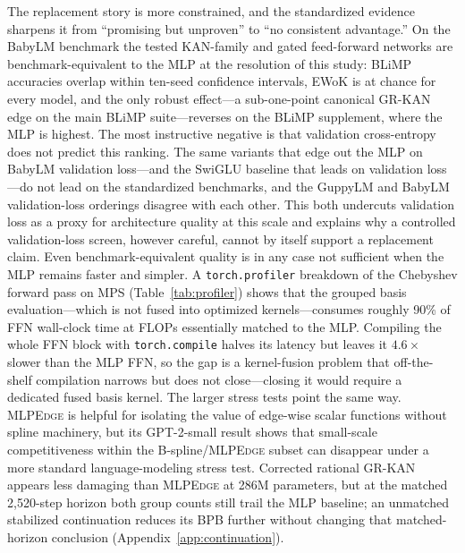 \documentclass[11pt]{article}
\newcommand{\modelname}[1]{\textsc{#1}}
\newcommand{\grkan}{\modelname{GR-KAN}}
\newcommand{\mlpedge}{\modelname{MLPEdge}}
\begin{document}
The replacement story is more constrained, and the standardized evidence sharpens it from ``promising but unproven'' to ``no consistent advantage.'' On the BabyLM benchmark the tested KAN-family and gated feed-forward networks are benchmark-equivalent to the MLP at the resolution of this study: BLiMP accuracies overlap within ten-seed confidence intervals, EWoK is at chance for every model, and the only robust effect---a sub-one-point canonical \grkan{} edge on the main BLiMP suite---reverses on the BLiMP supplement, where the MLP is highest. The most instructive negative is that validation cross-entropy does not predict this ranking. The same variants that edge out the MLP on BabyLM validation loss---and the SwiGLU baseline that leads on validation loss---do not lead on the standardized benchmarks, and the GuppyLM and BabyLM validation-loss orderings disagree with each other. This both undercuts validation loss as a proxy for architecture quality at this scale and explains why a controlled validation-loss screen, however careful, cannot by itself support a replacement claim. Even benchmark-equivalent quality is in any case not sufficient when the MLP remains faster and simpler. A \texttt{torch.profiler} breakdown of the Chebyshev forward pass on MPS (Table~\ref{tab:profiler}) shows that the grouped basis evaluation---which is not fused into optimized kernels---consumes roughly 90\% of FFN wall-clock time at FLOPs essentially matched to the MLP. Compiling the whole FFN block with \texttt{torch.compile} halves its latency but leaves it \(4.6\times\) slower than the MLP FFN, so the gap is a kernel-fusion problem that off-the-shelf compilation narrows but does not close---closing it would require a dedicated fused basis kernel. The larger stress tests point the same way. \mlpedge{} is helpful for isolating the value of edge-wise scalar functions without spline machinery, but its GPT-2-small result shows that small-scale competitiveness within the B-spline/\mlpedge{} subset can disappear under a more standard language-modeling stress test. Corrected rational \grkan{} appears less damaging than \mlpedge{} at 286M parameters, but at the matched 2,520-step horizon both group counts still trail the MLP baseline; an unmatched stabilized continuation reduces its BPB further without changing that matched-horizon conclusion (Appendix~\ref{app:continuation}).
\end{document}
